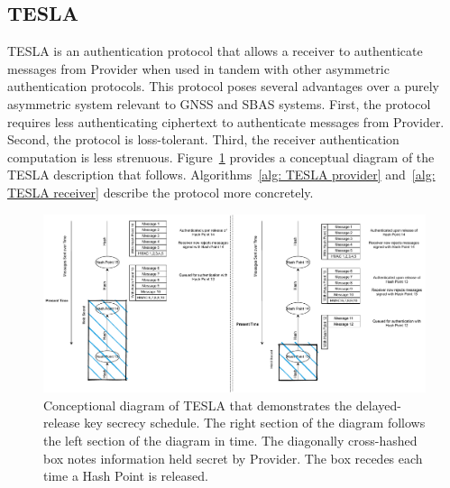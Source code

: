 \documentclass[letterpaper,times]{IONconf/IONconf}
\begin{document}
	\subsection{TESLA} \label{sub:tesla}

		TESLA is an authentication protocol that allows a receiver to authenticate messages from Provider when used in tandem with other asymmetric authentication protocols.
		This protocol poses several advantages over a purely asymmetric system relevant to GNSS and SBAS systems.
		First, the protocol requires less authenticating ciphertext to authenticate messages from Provider.
		Second, the protocol is loss-tolerant.
		Third, the receiver authentication computation is less strenuous.
		Figure~\ref{fig: TESLA Diagram} provides a conceptual diagram of the TESLA description that follows.
		Algorithms~\ref{alg: TESLA provider} and~\ref{alg: TESLA receiver} describe the protocol more concretely.
		\begin{figure}%
			\centering
			\includegraphics[width=\linewidth]{fig/TESLADiagram.pdf}
			\caption{
				Conceptional diagram of TESLA that demonstrates the delayed-release key secrecy schedule.
				The right section of the diagram follows the left section of the diagram in time.
				The diagonally cross-hashed box notes information held secret by Provider.
				The box recedes each time a Hash Point is released.
			}
			\label{fig: TESLA Diagram}
		\end{figure}
\end{document}
